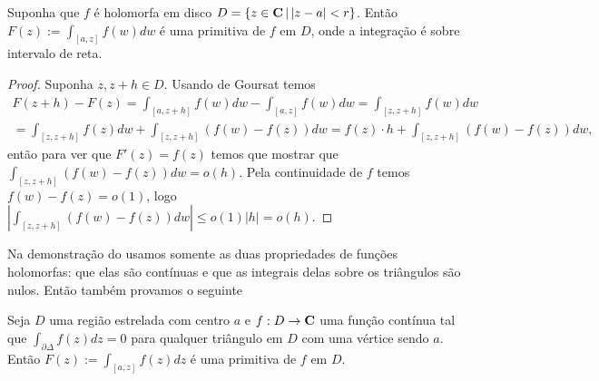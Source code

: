 \begin{lema}
\label{l:primitiva}
Suponha que $f$ é holomorfa em disco
$D = \{z \in \mathbf{C} \,|\, |z-a|<r\}$.
Então $F(z) := \int_{[a,z]} f(w) dw$ é uma primitiva de $f$ em $D$,
onde a integração é sobre intervalo de reta.
\end{lema}
\begin{proof}
Suponha $z,z+h \in D$. Usando  de Goursat temos
\begin{multline*}
F(z+h) - F(z) = \int_{[a,z+h]} f(w) dw - \int_{[a,z]} f(w) dw = \int_{[z,z+h]} f(w) dw \\
= \int_{[z,z+h]} f(z) dw  +  \int_{[z,z+h]} (f(w)-f(z)) dw 
= f(z) \cdot h + \int_{[z,z+h]} (f(w)-f(z)) dw,
\end{multline*}
então para ver que $F'(z) = f(z)$ temos que mostrar que
$\int_{[z,z+h]} (f(w)-f(z)) dw = o(h)$. Pela continuidade de $f$
temos $f(w)-f(z) = o(1)$, logo $|\int_{[z,z+h]} (f(w)-f(z)) dw| \leq o(1) |h| = o(h)$.
\end{proof}

Na demonstração do  usamos somente as duas propriedades de funções holomorfas:
que elas são contínuas e que as integrais delas sobre os triângulos são nulos.
Então também provamos o seguinte
\begin{lema}
\label{l:pre-morera}
Seja $D$ uma região estrelada com centro $a$
e $f : D \to \mathbf{C}$ uma função contínua
tal que
$\int_{\partial \Delta} f(z) dz = 0$ para qualquer triângulo em $D$
com uma vértice sendo $a$. Então $F(z) := \int_{[a,z]} f(z) dz$ é uma primitiva de $f$ em $D$.
\end{lema}

